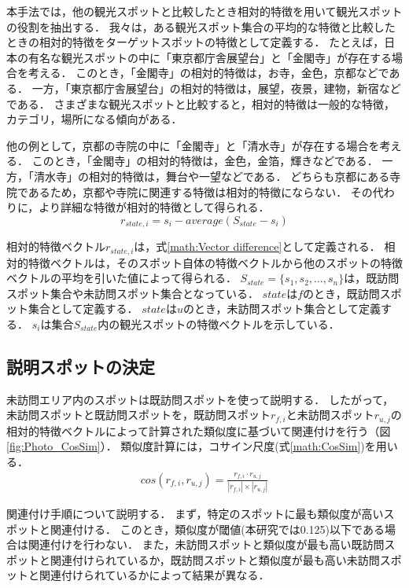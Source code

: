 \documentclass{deimj}
\begin{document}
本手法では，他の観光スポットと比較したとき相対的特徴を用いて観光スポットの役割を抽出する．
我々は，ある観光スポット集合の平均的な特徴と比較したときの相対的特徴をターゲットスポットの特徴として定義する．
たとえば，日本の有名な観光スポットの中に「東京都庁舎展望台」と「金閣寺」が存在する場合を考える．
このとき，「金閣寺」の相対的特徴は，お寺，金色，京都などである．
一方，「東京都庁舎展望台」の相対的特徴は，展望，夜景，建物，新宿などである．
さまざまな観光スポットと比較すると，相対的特徴は一般的な特徴，カテゴリ，場所になる傾向がある．

他の例として，京都の寺院の中に「金閣寺」と「清水寺」が存在する場合を考える．
このとき，「金閣寺」の相対的特徴は，金色，金箔，輝きなどである．
一方，「清水寺」の相対的特徴は，舞台や一望などである．
どちらも京都にある寺院であるため，京都や寺院に関連する特徴は相対的特徴にならない．
その代わりに，より詳細な特徴が相対的特徴として得られる．
\begin{equation}
  r_{state,i}=s_i-average(S_{state}-s_i)
  \label{math:Vector difference}
\end{equation}

相対的特徴ベクトル$r_{state,i}$は，式\ref{math:Vector difference}として定義される．
相対的特徴ベクトルは，そのスポット自体の特徴ベクトルから他のスポットの特徴ベクトルの平均を引いた値によって得られる．
$S_{state} =\{s_1,s_2,\dots,s_n\}$は，既訪問スポット集合や未訪問スポット集合となっている．
$state$は$f$のとき，既訪問スポット集合として定義する．
$state$は$u$のとき，未訪問スポット集合として定義する．
$s_i$は集合$S_{state}$内の観光スポットの特徴ベクトルを示している．

\subsection{説明スポットの決定}
\label{subsec:説明スポットの決定}
未訪問エリア内のスポットは既訪問スポットを使って説明する．
したがって，未訪問スポットと既訪問スポットを，既訪問スポット$r_{f,i}$と未訪問スポット$r_{u,j}$の相対的特徴ベクトルによって計算された類似度に基づいて関連付けを行う（図\ref{fig:Photo_CosSim}）．
類似度計算には，コサイン尺度(式\ref{math:CosSim})を用いる．
\begin{eqnarray}
  cos(r_{f,i},r_{u,j})=\frac{r_{f,i} \cdot r_{u,j}}{|r_{f,i}| \times |r_{u,j}|}
  \label{math:CosSim}
\end{eqnarray}

関連付け手順について説明する．
まず，特定のスポットに最も類似度が高いスポットと関連付ける．
このとき，類似度が閾値(本研究では0.125)以下である場合は関連付けを行わない．
また，未訪問スポットと類似度が最も高い既訪問スポットと関連付けられているか，既訪問スポットと類似度が最も高い未訪問スポットと関連付けられているかによって結果が異なる．
\end{document}
